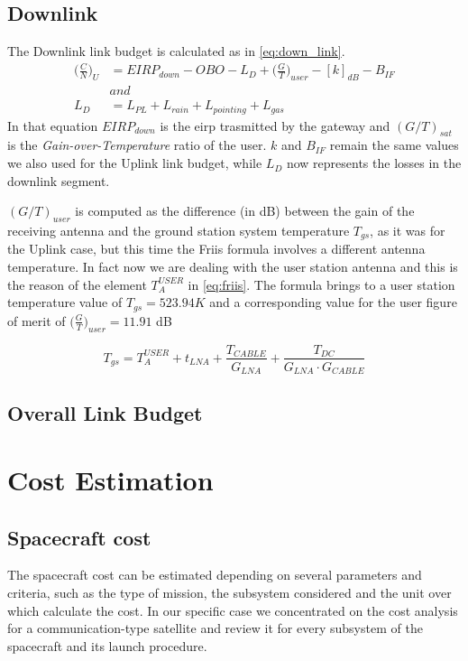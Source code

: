 \documentclass[11pt,a4paper,titlepage]{article}
\begin{document}
	\subsection{Downlink}
The Downlink link budget is calculated as in \autoref{eq:down_link}.
  \begin{equation}
	\begin{split}
      \bigg(\frac{C}{N}\bigg)_U &= EIRP_{down} - OBO - L_D + \bigg(\frac{G}{T}\bigg)_{user} - [k]_{dB} - B_{IF}\\
	&and\\
      L_D &= L_{PL} + L_{rain} + L_{pointing} + L_{gas}
	\end{split}
	\label{eq:down_link}
  \end{equation}
  In that equation $EIRP_{down}$ is the \gls{eirp} trasmitted by the gateway and $(G/T)_{sat}$ is the \textit{Gain-over-Temperature} ratio of the user. $k$ and $B_{IF}$ remain the same values we also used for the Uplink link budget, while $L_D$ now represents the losses in the downlink segment.

  $(G/T)_{user}$ is computed as the difference (in dB) between the gain of the receiving antenna and the ground station system temperature $T_{gs}$, as it was for the Uplink case, but this time the Friis formula involves a different antenna temperature. In fact now we are dealing with the user station antenna and this is the reason of the element $T_A^{USER}$ in \autoref{eq:friis}. The formula brings to a user station temperature value of $T_{gs} = 523.94 K$ and a corresponding value for the user figure of merit of $\bigg(\frac{G}{T}\bigg)_{user} = 11.91$ dB 

  \begin{equation}\label{eq:friis}
    T_{gs} = T_A^{USER} + t_{LNA} + \frac{T_{CABLE}}{G_{LNA}} + \frac{T_{DC}}{G_{LNA}\cdot G_{CABLE}}
  \end{equation}
	\subsection{Overall Link Budget}
\lipsum[1]

\section{Cost Estimation}
	\subsection{Spacecraft cost}
		The spacecraft cost can be estimated depending on several parameters and criteria, such as the type of mission, the 				subsystem considered and the unit over which calculate the cost. In our specific case we concentrated on the cost analysis 		for a communication-type satellite and review it for every subsystem of the spacecraft and its launch procedure.\\
		
\end{document}

